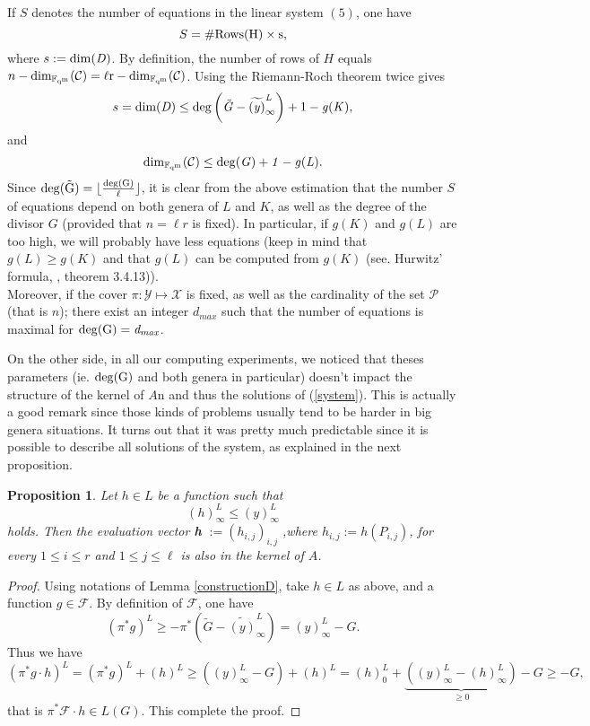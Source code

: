 \documentclass[10pt]{article}
\newtheorem{prop1}{Proposition}[]
\newcommand{\s}{\vspace{0.3cm}}
\newcommand{\cd}{\cdot}
\newcommand{\fqm}{\mathbb{F}_{q^m}}
\newcommand{\X}{\mathcal{X}}
\newcommand{\Y}{\mathcal{Y}}
\newcommand{\PR}{\mathcal{P}}
\begin{document}
\s 

If $S$ denotes the number of equations in the linear system $(5)$, one have 
\[S = \#\rm{Rows}(H) \times s,\]
where $s := \rm \dim(\it D)$. By definition, the number of rows of $H$ equals $n-\rm dim_{\fqm}(\mathcal{C})= \ell r - \rm dim_{\fqm}(\mathcal{C})$. Using the Riemann-Roch theorem  twice gives 
\[s = \rm dim (\it D) \leq \rm{deg}\left(\it \tilde{G}-\widetilde{(y)}^L_{\infty}\right) +1 - \it g(K) ,\]
and
\[\rm dim_{\fqm}(\mathcal{C}) \leq \rm{deg}\it(G)+1-g(L).\]
Since $\rm{deg}(\tilde{G}) = \lfloor \frac{\rm{deg}(G)}{\ell} \rfloor$, it is clear from the above estimation that the number $S$ of equations depend on both genera of $L$ and $K$, as well as the degree of the divisor $G$ (provided that $n=\ell r$ is fixed). In particular, if $g(K)$ and $g(L)$ are too high, we will probably have less equations (keep in mind that $g(L) \geq g(K)$ and that $g(L)$ can be computed from $g(K)$ (see. Hurwitz' formula, \cite{Sti}, theorem 3.4.13)). \\
Moreover, if the cover $\pi : \Y \longmapsto \X$ is fixed, as well as the cardinality of the set $\PR$ (that is $n$); there exist an integer $d_{max}$ such that the number of equations is maximal for $\rm{deg}(G)= \it d_{max}$. 

\s

On the other side, in all our computing experiments, we noticed that theses parameters (ie. $\rm{deg}(G)$ and both genera in particular) doesn't impact the structure of the kernel of $A$n and thus the solutions of (\ref{system}). This is actually a good remark since those kinds of problems usually tend to be harder in big genera situations. It turns out that it was pretty much predictable since it is possible to describe all solutions of the system, as explained in the next proposition. 

\s

\begin{prop1} \label{othersolutions}
Let $h \in L$ be a function such that 
\[ (h)^L_{\infty} \leq (y)^L_{\infty}\]
holds. Then the evaluation vector \textbf{h} $ := (h_{i,j})_{i,j}$ ,where $h_{i,j} := h(P_{i,j})$, for every $1 \leq i \leq r$ and $1 \leq j \leq \ell$ is also in the kernel of $A$.
\end{prop1}

\s

\begin{proof}
Using notations of Lemma \ref{constructionD}, take $h \in L$ as above, and a function $g \in \mathcal{F}$. By definition of $\mathcal{F}$, one have 
\[(\pi^*g)^L \geq -\pi^*\left(\tilde{G}-\widetilde{(y)}^L_{\infty}\right) = (y)^L_{\infty} - G.\]
Thus we have 
\[(\pi^*g \cd h)^L = (\pi^*g)^L  + (h)^L \geq  ((y)^L_{\infty} - G)+(h)^L = (h)^L_0 + \underbrace{((y)^L_{\infty}-(h)^L_{\infty})}_{\geq 0} - G \geq -G,\]
that is $\pi^*\mathcal{F}\cd h \in L(G)$. This complete the proof.

\end{proof}
\end{document}
